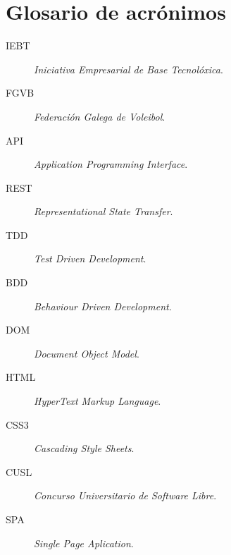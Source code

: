 \chapter{Glosario de acrónimos}
\label{chap:glosario-acronimos}


\begin{description}
 \item [IEBT] \emph{Iniciativa Empresarial de Base Tecnolóxica}.
 \item [FGVB] \emph{Federación Galega de Voleibol}.
 \item [API] \emph{Application Programming Interface}.
 \item [REST] \emph{Representational State Transfer}.
 \item [TDD] \emph{Test Driven Development}.
 \item [BDD] \emph{Behaviour Driven Development}.
 \item [DOM] \emph{Document Object Model}.
 \item [HTML] \emph{HyperText Markup Language}.
 \item [CSS3] \emph{Cascading Style Sheets}.
 \item [CUSL] \emph{Concurso Universitario de Software Libre}.
 \item [SPA] \emph{Single Page Aplication}.

\end{description}

